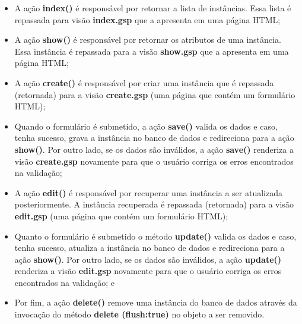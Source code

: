 \begin{itemize}

\vspace{0.3cm}

\item   A  ação  {\bf   index()}  é   responsável  por   retornar  a   lista  de
  instâncias. Essa lista é repassada  para visão {\bf index.gsp} que a apresenta
  em uma página HTML;

\vspace{0.3cm}

\item  A ação  {\bf  show()} é  responsável  por retornar  os  atributos de  uma
  instância.   Essa instância  é repassada  para a  visão {\bf  show.gsp}  que a
  apresenta em uma página HTML;

\vspace{0.3cm}

\item  A  ação {\bf  create()}  é  responsável por  criar  uma  instância que  é
  repassada (retornada) para a visão  {\bf create.gsp} (uma página que contém um
  formulário HTML);

\vspace{0.3cm}

\item Quando  o formulário é  submetido, a ação  {\bf save()} valida os  dados e
  caso, tenha sucesso, grava a instância  no banco de dados e redireciona para a
  ação {\bf  show()}.  Por outro  lado, se os  dados são inválidos, a  ação {\bf
    save()}  renderiza a  visão {\bf  create.gsp} novamente  para que  o usuário
  corriga os erros encontrados na validação;

\vspace{0.3cm}

\item  A ação  {\bf edit()}  é  responsável por  recuperar uma  instância a  ser
  atualizada  posteriormente.  A  instância recuperada  é  repassada (retornada)
  para a visão {\bf edit.gsp} (uma página que contém um formulário HTML);

\vspace{0.3cm}

\item Quanto o formulário é submetido  o método {\bf update()} valida os dados e
  caso, tenha sucesso, atualiza a instância no banco de dados e redireciona para
  a ação {\bf show()}.   Por outro lado, se os dados são  inválidos, a ação {\bf
    update()}  renderiza a  visão {\bf  edit.gsp} novamente  para que  o usuário
  corriga os erros encontrados na validação; e

\vspace{0.3cm}

\item Por  fim, a  ação {\bf delete()}  remove uma  instância do banco  de dados
  através  da invocação  do método  {\bf delete  (flush:true)} no  objeto  a ser
  removido.

\end{itemize}

